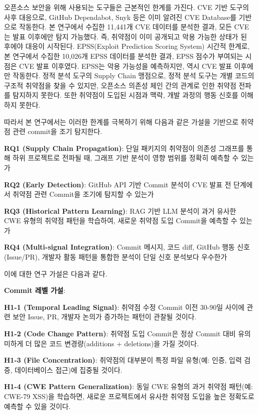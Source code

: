 ﻿\documentclass[conference]{IEEEtran}
\begin{document}
오픈소스 보안을 위해 사용되는 도구들은 근본적인 한계를 가진다. CVE 기반 도구의 사후 대응으로, GitHub Dependabot, Snyk 등은 이미 알려진 CVE Database를 기반으로 작동한다. 본 연구에서 수집한 11,441개 CVE 데이터를 분석한 결과, 모든 CVE는 발표 이후에만 탐지 가능했다. 즉, 취약점이 이미 공개되고 악용 가능한 상태가 된 후에야 대응이 시작된다. EPSS(Exploit Prediction Scoring System)  시간적 한계로, 본 연구에서 수집한 10,026개 EPSS 데이터를 분석한 결과, EPSS 점수가 부여되는 시점은 CVE 발표 이후였다. EPSS는 악용 가능성을 예측하지만, 역시 CVE 발표 이후에만 작동한다. 정적 분석 도구의 Supply Chain 맹점으로, 정적 분석 도구는 개별 코드의 구조적 취약점을 찾을 수 있지만, 오픈소스 의존성 체인 간의 관계로 인한 취약점 전파를 탐지하지 못한다. 또한 취약점이 도입된 시점과 맥락, 개발 과정의 행동 신호를 이해하지 못한다.

\indent 따라서 본 연구에서는 이러한 한계를 극복하기 위해 다음과 같은 가설을 기반으로 취약점 관련 commit을 조기 탐지한다.

\noindent\textbf{RQ1 (Supply Chain Propagation)}: 단일 패키지의 취약점이 의존성 그래프를 통해 하위 프로젝트로 전파될 때, 그래프 기반 분석이 영향 범위를 정확히 예측할 수 있는가

\noindent\textbf{RQ2 (Early Detection)}: GitHub API 기반 Commit 분석이 CVE 발표 전 단계에서 취약점 관련 Commit을 조기에 탐지할 수 있는가

\noindent\textbf{RQ3 (Historical Pattern Learning)}: RAG 기반 LLM 분석이 과거 유사한 CWE 유형의 취약점 패턴을 학습하여, 새로운 취약점 도입 Commit을 예측할 수 있는가

\noindent\textbf{RQ4 (Multi-signal Integration)}: Commit 메시지, 코드 diff, GitHub 행동 신호(Issue/PR), 개발자 활동 패턴을 통합한 분석이 단일 신호 분석보다 우수한가

\noindent 이에 대한 연구 가설은 다음과 같다.

\noindent\textbf{Commit 레벨 가설}:

\noindent\textbf{H1-1 (Temporal Leading Signal)}: 취약점 수정 Commit 이전 30-90일 사이에 관련 보안 Issue, PR, 개발자 논의가 증가하는 패턴이 관찰될 것이다.

\noindent\textbf{H1-2 (Code Change Pattern)}: 취약점 도입 Commit은 정상 Commit 대비 유의미하게 더 많은 코드 변경량(additions + deletions)을 가질 것이다.

\noindent\textbf{H1-3 (File Concentration)}: 취약점의 대부분이 특정 파일 유형(예: 인증, 입력 검증, 데이터베이스 접근)에 집중될 것이다.

\noindent\textbf{H1-4 (CWE Pattern Generalization)}: 동일 CWE 유형의 과거 취약점 패턴(예: CWE-79 XSS)을 학습하면, 새로운 프로젝트에서 유사한 취약점 도입을 높은 정확도로 예측할 수 있을 것이다.
\end{document}
